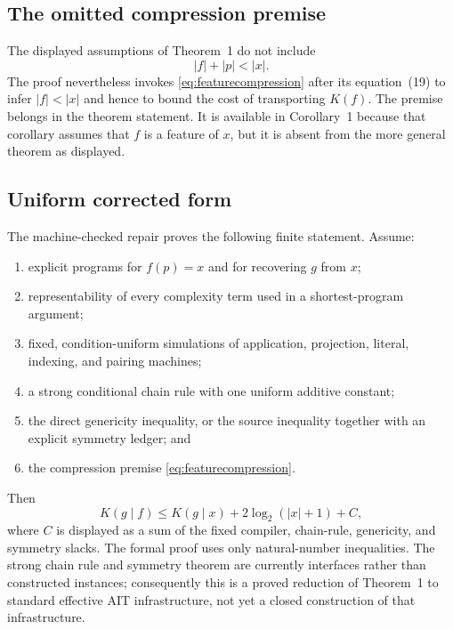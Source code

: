 \documentclass[11pt]{article}
\newcommand{\bits}[1]{\lvert #1\rvert}
\newcommand{\K}{K}
\begin{document}
\subsection{The omitted compression premise}

The displayed assumptions of Theorem~1 do not include
\begin{equation}
  \bits f+\bits p<\bits x.
  \label{eq:featurecompression}
\end{equation}
The proof nevertheless invokes \eqref{eq:featurecompression} after its
equation~(19) to infer $\bits f<\bits x$ and hence to bound the cost of
transporting $\K(f)$.  The premise belongs in the theorem statement.  It is
available in Corollary~1 because that corollary assumes that $f$ is a feature
of $x$, but it is absent from the more general theorem as displayed.

\subsection{Uniform corrected form}

The machine-checked repair proves the following finite statement.  Assume:

\begin{enumerate}
  \item explicit programs for $f(p)=x$ and for recovering $g$ from $x$;
  \item representability of every complexity term used in a shortest-program
        argument;
  \item fixed, condition-uniform simulations of application, projection,
        literal, indexing, and pairing machines;
  \item a strong conditional chain rule with one uniform additive constant;
  \item the direct genericity inequality, or the source inequality together
        with an explicit symmetry ledger; and
  \item the compression premise \eqref{eq:featurecompression}.
\end{enumerate}

Then
\[
  \K(g\mid f)
  \leq \K(g\mid x)+2\log_2(\bits x+1)+C,
\]
where $C$ is displayed as a sum of the fixed compiler, chain-rule,
genericity, and symmetry slacks.  The formal proof uses only natural-number
inequalities.  The strong chain rule and symmetry theorem are currently
interfaces rather than constructed instances; consequently this is a proved
reduction of Theorem~1 to standard effective AIT infrastructure, not yet a
closed construction of that infrastructure.
\end{document}
